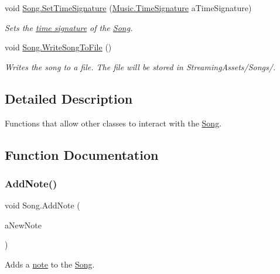 \begin{DoxyCompactItemize}
void \hyperlink{group___song_pub_func_gaf9f2c7e6f4400f6f9854e68e70a49470}{Song.\+Set\+Time\+Signature} (\hyperlink{group___music_structs_struct_music_1_1_time_signature}{Music.\+Time\+Signature} a\+Time\+Signature)
\begin{DoxyCompactList}\small\item\em Sets the \hyperlink{group___music_structs_struct_music_1_1_time_signature}{time signature} of the \hyperlink{class_song}{Song}. \end{DoxyCompactList}\item 
void \hyperlink{group___song_pub_func_ga70b0f6021c3b0590c561a88e3d1e5c2f}{Song.\+Write\+Song\+To\+File} ()
\begin{DoxyCompactList}\small\item\em Writes the song to a file. The file will be stored in Streaming\+Assets/\+Songs/. \end{DoxyCompactList}\end{DoxyCompactItemize}


\subsection{Detailed Description}
Functions that allow other classes to interact with the \hyperlink{class_song}{Song}. 

\subsection{Function Documentation}
\mbox{\label{group___song_pub_func_gab7c8fe4dc29f5ae7b7728c583fe51f7e}} 
\subsubsection{\texorpdfstring{Add\+Note()}{AddNote()}}
{\footnotesize\ttfamily void Song.\+Add\+Note (\begin{DoxyParamCaption}\item[{\hyperlink{group___music_structs_struct_music_1_1_combined_note}{Music.\+Combined\+Note}}]{a\+New\+Note }\end{DoxyParamCaption})}



Adds a \hyperlink{group___music_structs_struct_music_1_1_combined_note}{note} to the \hyperlink{class_song}{Song}. 


